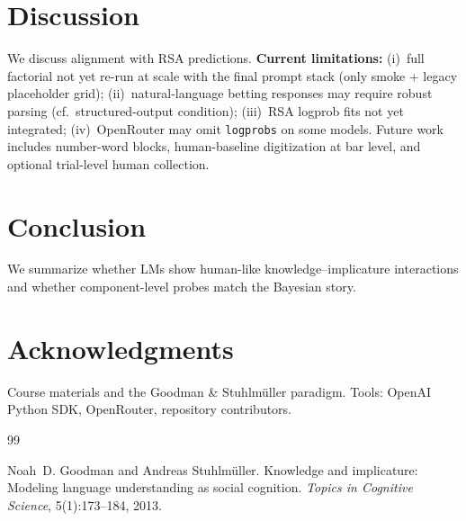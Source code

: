 \documentclass[11pt]{article}
\begin{document}
\section{Discussion}
We discuss alignment with RSA predictions. \textbf{Current limitations:} (i)~full factorial not yet re-run at scale with the final prompt stack (only smoke + legacy placeholder grid); (ii)~natural-language betting responses may require robust parsing (cf.\ structured-output condition); (iii)~RSA logprob fits not yet integrated; (iv)~OpenRouter may omit \texttt{logprobs} on some models. Future work includes number-word blocks, human-baseline digitization at bar level, and optional trial-level human collection.

\section{Conclusion}
We summarize whether LMs show human-like knowledge--implicature interactions and whether component-level probes match the Bayesian story.

\section*{Acknowledgments}
Course materials and the Goodman \& Stuhlm\"{u}ller paradigm. Tools: OpenAI Python SDK, OpenRouter, repository contributors.


\begin{thebibliography}{99}

Noah~D. Goodman and Andreas Stuhlm\"{u}ller.
\newblock Knowledge and implicature: Modeling language understanding as social cognition.
\newblock \emph{Topics in Cognitive Science}, 5(1):173--184, 2013.

\end{thebibliography}
\end{document}
